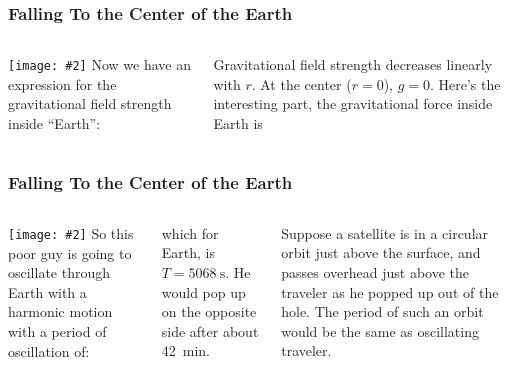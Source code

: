 \documentclass[12pt,compress,aspectratio=169]{beamer}
\newcommand{\pic}[2]{\texttt{[image: \#2]}}
\begin{document}
\begin{frame}
  \frametitle{Falling To the Center of the Earth}

  \begin{columns}
    \pic{1}{eartholeg.png}
    Now we have an expression for the gravitational field strength inside
    ``Earth'':

    
    \vspace{-.1in}Gravitational field strength decreases linearly with $r$. At
    the center ($r=0$), $g=0$. Here's the interesting part, the gravitational
    force inside Earth is
    
  \end{columns}
\end{frame}




\begin{frame}
  \frametitle{Falling To the Center of the Earth}

  \begin{columns}
    \pic{1}{eartholsat.png}
    So this poor guy is going to oscillate through Earth with a harmonic motion
    with a period of oscillation of:


    which for Earth, is $T=\SI{5068}{\second}$. He
    would pop up on the opposite side after about
    \SI{42}{min}.

    \vspace{.1in}Suppose a satellite is in a circular orbit just above the
    surface, and passes overhead just above the traveler as he popped up
    out of the hole. The period of such an orbit would be the same as
    oscillating traveler.
    
  \end{columns}
\end{frame}
\end{document}
